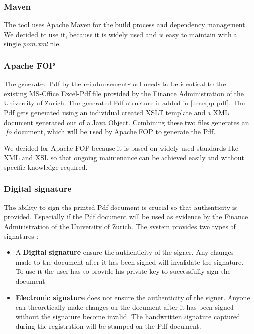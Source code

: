 \subsubsection{Maven}
The tool uses Apache Maven \cite{maven} for the build process and dependency management. We decided to use it, because it is widely used and is easy to maintain with a single \textit{pom.xml} file.

\subsubsection{Apache FOP}
The generated Pdf by the reimbursement-tool needs to be identical to the existing MS-Office Excel-Pdf file provided by the Finance Administration of the University of Zurich. The generated Pdf structure is added in \ref{sec:app-pdf}.\newline
The Pdf gets generated using an individual created XSLT template and a XML document generated out of a Java Object. Combining these two files generates an \textit{.fo} document, which will be used by Apache FOP \cite{apache-fop} to generate the Pdf.\par
We decided for Apache FOP because it is based on widely used standards like XML and XSL so that ongoing maintenance can be achieved easily and without specific knowledge required.

\subsubsection{Digital signature}
The ability to sign the printed Pdf document is crucial so that authenticity is provided. Especially if the Pdf document will be used as evidence by the Finance Administration of the University of Zurich. The system provides two types of signatures \cite{arx-signature}:
\begin{itemize}
    \item A \textbf{Digital signature} ensure the authenticity of the signer. Any changes made to the document after it has been signed will invalidate the signature. To use it the user has to provide his private key to successfully sign the document.
    \item \textbf{Electronic signature} does not ensure the authenticity of the signer. Anyone can theoretically make changes on the document after it has been signed without the signature become invalid. The handwritten signature captured during the registration will be stamped on the Pdf document.
\end{itemize}\par

